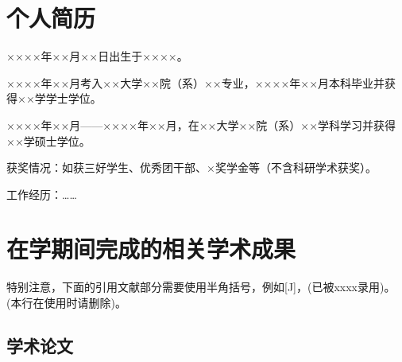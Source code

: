 
\begin{resume}

  \section*{个人简历}

  ××××年××月××日出生于××××。

  ××××年××月考入××大学××院（系）××专业，××××年××月本科毕业并获得××学学士学位。

  ××××年××月——××××年××月，在××大学××院（系）××学科学习并获得××学硕士学位。

  获奖情况：如获三好学生、优秀团干部、×奖学金等（不含科研学术获奖）。

  工作经历：……

  \section*{在学期间完成的相关学术成果}

  特别注意，下面的引用文献部分需要使用半角括号，例如[J]，(已被xxxx录用)。(本行在使用时请删除)。

  \subsection{学术论文}

  \begin{bibunit}
    \renewcommand{\bibsection}{}
    \nocite{zhangkun1994,bixon1996dynamics}
  \end{bibunit}



\end{resume}
